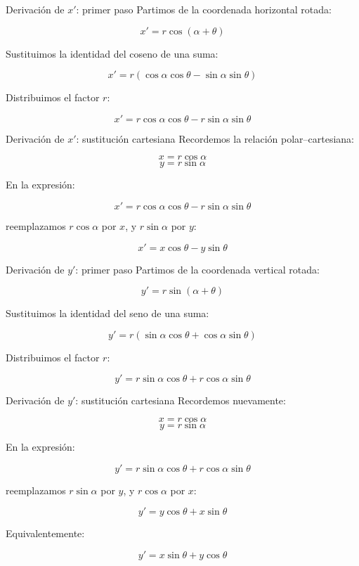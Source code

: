 \documentclass{beamer}
\begin{document}
\begin{frame}{Derivación de \(x'\): primer paso}
Partimos de la coordenada horizontal rotada:

\[
x'=r\cos(\alpha+\theta)
\]

Sustituimos la identidad del coseno de una suma:

\[
x'=r(\cos\alpha\cos\theta-\sin\alpha\sin\theta)
\]

Distribuimos el factor \(r\):

\[
x'=r\cos\alpha\cos\theta-r\sin\alpha\sin\theta
\]
\end{frame}

\begin{frame}{Derivación de \(x'\): sustitución cartesiana}
Recordemos la relación polar--cartesiana:

\[
x=r\cos\alpha
\]
\[
y=r\sin\alpha
\]

En la expresión:

\[
x'=r\cos\alpha\cos\theta-r\sin\alpha\sin\theta
\]

reemplazamos \(r\cos\alpha\) por \(x\), y \(r\sin\alpha\) por \(y\):

\[
x'=x\cos\theta-y\sin\theta
\]
\end{frame}

\begin{frame}{Derivación de \(y'\): primer paso}
Partimos de la coordenada vertical rotada:

\[
y'=r\sin(\alpha+\theta)
\]

Sustituimos la identidad del seno de una suma:

\[
y'=r(\sin\alpha\cos\theta+\cos\alpha\sin\theta)
\]

Distribuimos el factor \(r\):

\[
y'=r\sin\alpha\cos\theta+r\cos\alpha\sin\theta
\]
\end{frame}

\begin{frame}{Derivación de \(y'\): sustitución cartesiana}
Recordemos nuevamente:

\[
x=r\cos\alpha
\]
\[
y=r\sin\alpha
\]

En la expresión:

\[
y'=r\sin\alpha\cos\theta+r\cos\alpha\sin\theta
\]

reemplazamos \(r\sin\alpha\) por \(y\), y \(r\cos\alpha\) por \(x\):

\[
y'=y\cos\theta+x\sin\theta
\]

Equivalentemente:

\[
y'=x\sin\theta+y\cos\theta
\]
\end{frame}
\end{document}
